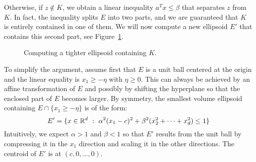 Otherwise, if $z \not\in K$,
we obtain a linear inequality $a^Tx \leq \beta$ that separates $z$ from $K$.
In fact, the inequality splits $E$ into two parts,
and we are guaranteed that $K$ is entirely contained in one of them.
We will now compute a new ellipsoid $E'$ that contains this second part,
see Figure~\ref{fig:ellipsoid-method}.
\begin{figure}
  \begin{center}
  \end{center}
  \caption{Computing a tighter ellipsoid containing $K$.}
  \label{fig:ellipsoid-method}
\end{figure}

To simplify the argument,
assume first that $E$ is a unit ball centered at the origin
and the linear equality is $x_1 \geq -\eta$ with $\eta \geq 0$.
This can always be achieved by an affine transformation of $E$ and possibly by shifting the hyperplane
so that the enclosed part of $E$ becomes larger.
By symmetry, the smallest volume ellipsoid containing $E \cap \{ x_1 \geq -\eta \}$ is of the form:
\[
  E' = \{ x \in \mathbb{R}^d ~:~ \alpha^2 (x_1 - c)^2 + \beta^2 (x_2^2 + \dots + x_d^2) \leq 1 \}
\]
Intuitively, we expect $\alpha > 1$ and $\beta < 1$ so that $E'$ results from the unit ball
by compressing it in the $x_1$ direction and scaling it in the other directions.
The centroid of $E'$ is at $(c,0,\ldots,0)$.

